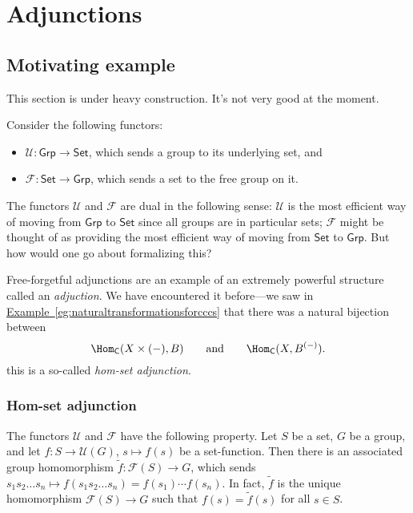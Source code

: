 \documentclass[notes.tex]{subfiles}
\begin{document}
\chapter{Adjunctions}\label{sec:adjunctions}

\section{Motivating example}
\label{sec:motivating_example}

\begin{note}
  This section is under heavy construction. It's not very good at the moment.
\end{note}

Consider the following functors:
\begin{itemize}
  \item $\mathcal{U}\colon \mathsf{Grp} \rightarrow \mathsf{Set}$, which sends a group to its underlying set, and

  \item $\mathcal{F}\colon \mathsf{Set} \rightarrow \mathsf{Grp}$, which sends a set to the free group on it.
\end{itemize}

The functors $\mathcal{U}$ and $\mathcal{F}$ are dual in the following sense: $\mathcal{U}$ is the most efficient way of moving from $\mathsf{Grp}$ to $\mathsf{Set}$ since all groups are in particular sets; $\mathcal{F}$ might be thought of as providing the most efficient way of moving from $\mathsf{Set}$ to $\mathsf{Grp}$. But how would one go about formalizing this?

Free-forgetful adjunctions are an example of an extremely powerful structure called an \emph{adjuction}. We have encountered it before---we saw in \hyperref[eg:naturaltransformationsforcccs]{Example~\ref*{eg:naturaltransformationsforcccs}} that there was a natural bijection between
\begin{equation*}
  \Hom_{\mathsf{C}}(X \times (-), B)\qquad\text{and}\qquad \Hom_{\mathsf{C}}(X, B^{(-)}).
\end{equation*}
this is a so-called \emph{hom-set adjunction}.

\subsection{Hom-set adjunction}
\label{ssc:hom_set_adjunction}

The functors $\mathcal{U}$ and $\mathcal{F}$ have the following property. Let $S$ be a set, $G$ be a group, and let $f\colon S \to \mathcal{U}(G)$, $s \mapsto f(s)$ be a set-function. Then there is an associated group homomorphism $\tilde{f}\colon \mathcal{F}(S) \to G$, which sends $s_{1}s_{2}\dots s_{n} \mapsto f(s_{1}s_{2}\dots s_{n}) = f(s_{1})\cdots f(s_{n})$. In fact, $\tilde{f}$ is the unique homomorphism $\mathcal{F}(S) \to G$ such that $f(s) = \tilde{f}(s)$ for all $s \in S$.
\end{document}
